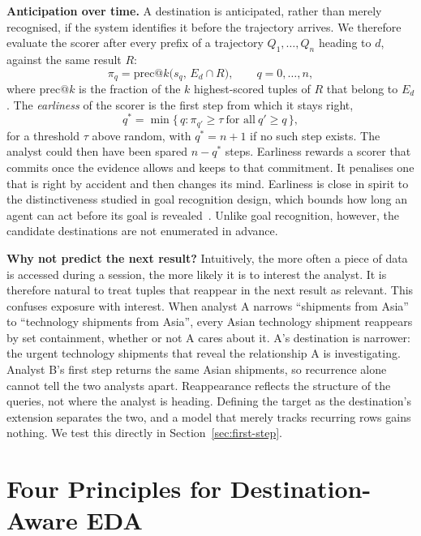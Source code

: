 \documentclass[sigconf]{acmart}
\begin{document}
\textbf{Anticipation over time.}
A destination is anticipated, rather than merely recognised, if the system identifies it before the trajectory arrives. We therefore evaluate the scorer after every prefix of a trajectory $Q_1,\ldots,Q_n$ heading to $d$, against the same result $R$:
\begin{equation}
  \pi_q=\mathrm{prec@}k\big(s_q,\,E_d\cap R\big),\qquad q=0,\ldots,n,
  \label{eq:prefix}
\end{equation}
where $\mathrm{prec@}k$ is the fraction of the $k$ highest-scored tuples of $R$ that belong to $E_d$. The \emph{earliness} of the scorer is the first step from which it stays right,
\begin{equation}
  q^{*}=\min\{\,q : \pi_{q'}\ge\tau\ \text{for all}\ q'\ge q\,\},
  \label{eq:earliness}
\end{equation}
for a threshold $\tau$ above random, with $q^{*}=n+1$ if no such step exists. The analyst could then have been spared $n-q^{*}$ steps. Earliness rewards a scorer that commits once the evidence allows and keeps to that commitment. It penalises one that is right by accident and then changes its mind. Earliness is close in spirit to the distinctiveness studied in goal recognition design, which bounds how long an agent can act before its goal is revealed~\cite{kerenGoalRecognitionDesign2014}. Unlike goal recognition, however, the candidate destinations are not enumerated in advance.

\textbf{Why not predict the next result?}
Intuitively, the more often a piece of data is accessed during a session, the more likely it is to interest the analyst. It is therefore natural to treat tuples that reappear in the next result as relevant. This confuses exposure with interest. When analyst A narrows ``shipments from Asia'' to ``technology shipments from Asia'', every Asian technology shipment reappears by set containment, whether or not A cares about it. A's destination is narrower: the urgent technology shipments that reveal the relationship A is investigating. Analyst B's first step returns the same Asian shipments, so recurrence alone cannot tell the two analysts apart. Reappearance reflects the structure of the queries, not where the analyst is heading. Defining the target as the destination's extension separates the two, and a model that merely tracks recurring rows gains nothing. We test this directly in Section~\ref{sec:first-step}.

\section{Four Principles for Destination-Aware EDA}
\label{sec:principles}
\end{document}
